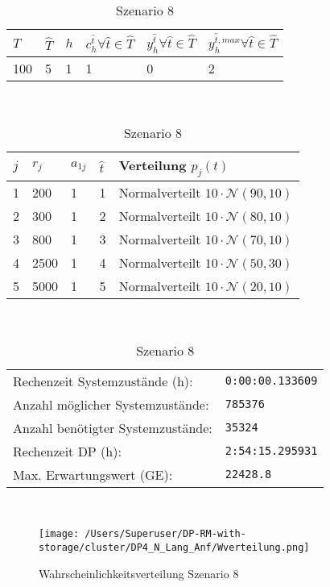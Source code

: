 \begin{table}[h!]
\renewcommand{\arraystretch}{1.5}
  \begin{center}
    \caption{Szenario 8}  \label{S8}
    \vspace*{3mm}
    \begin{tabular}{l l l l l l}   %
    $T$ & $\hat T$  & $h$ & $c_h^{\hat t}\forall \hat{t}\in{\hat T}$ & $y_h^{\hat t}\forall \hat{t}\in{\hat T}$  & $y_h^{{\hat t},max}\forall \hat{t}\in{\hat T}$  \\  \hline
100 & 5 & 1 & 1 & 0 & 2  \\ \hline
    \end{tabular} \\[3mm]
        \begin{tabular}{p{1cm} p{1cm} p{1cm}  p{1cm} p{6cm}}   %
    $j$ & $r_j$  & $a_{1j}$ & $\hat t$ & Verteilung $p_j(t)$ \\  \hline
1 & 200 & 1 & 1 & Normalverteilt $10\cdot\mathcal{N}(90, 10)$   \\
2 & 300 & 1 & 2 & Normalverteilt $10\cdot\mathcal{N}(80, 10)$  \\
3 & 800 & 1 & 3 & Normalverteilt $10\cdot\mathcal{N}(70, 10)$  \\
4 & 2500 & 1 & 4 & Normalverteilt $10\cdot\mathcal{N}(50, 30)$  \\
5 & 5000 & 1 & 5 & Normalverteilt $10\cdot\mathcal{N}(20, 10)$ \\
\hline
    \end{tabular} \\[3mm]
     \begin{tabular}{p{7cm}p{5cm}} \hline
     Rechenzeit Systemzustände (h): & \texttt{0:00:00.133609} \\
     Anzahl möglicher Systemzustände: & \texttt{785376} \\
     Anzahl benötigter Systemzustände: & \texttt{35324} \\ 
     Rechenzeit DP (h): & \texttt{2:54:15.295931} \\ 
          Max. Erwartungswert (GE): & \texttt{22428.8} \\ \hline
         \end{tabular} \\[3mm]
  \end{center}
\end{table}

\clearpage
\begin{figure}[h!]
  \begin{center}
    \texttt{[image: /Users/Superuser/DP-RM-with-storage/cluster/DP4\_N\_Lang\_Anf/Wverteilung.png]}
    \caption{Wahrscheinlichkeitsverteilung Szenario 8}  \label{SB8}
  \end{center}
\end{figure}

